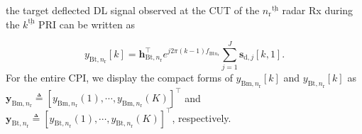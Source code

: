 \documentclass[9pt,journal]{IEEEtran}
\newcommand{\paren}[1]{\left({#1}\right)}
\newcommand{\bracket}[1]{{\left [{#1}\right ]}}
\newcommand{\ith}[1]    {{#1}^{\underline{\text{th}}}}
\newcommand{\rr}{_\mathrm{r}}
\newcommand{\target}{\mathrm{t}}
\theoremstyle{definition}
\begin{document}
\fi
the target deflected DL signal observed at the CUT of the $\ith{n\rr}$ radar Rx during the $\ith{k}$ PRI can be written as\par\noindent\small
\begin{equation}
y_{\mathrm{Bt},n\rr}\bracket{k}=\mathbf{h}_{\mathrm{Bt},n\rr}^\top e^{j2\pi\paren{k-1} f_{\mathrm{Bt}n_\mathrm{r}}}
\sum_{j=1}^\mathit{J}\mathbf{s}_{\textrm{d},j}\bracket{k,1}.
\end{equation}\normalsize
For the entire CPI, we display the compact forms of $y_{\mathrm{Bm},n\rr}\bracket{k}$ and $y_{\mathrm{Bt},n\rr}\bracket{k}$ as $\mathbf{y}_{\mathrm{Bm},n\rr}\triangleq\bracket{y_{\mathrm{Bm},n\rr}\paren{1},\cdots,y_{\mathrm{Bm},n\rr}\paren{\mathit{K}}}^\top$ and  $\mathbf{y}_{\mathrm{Bt},n\rr}\triangleq\bracket{y_{\mathrm{Bt},n\rr}\paren{1},\cdots,y_{\mathrm{Bt},n\rr}\paren{\mathit{K}}}^\top$, respectively.  
\end{document}
